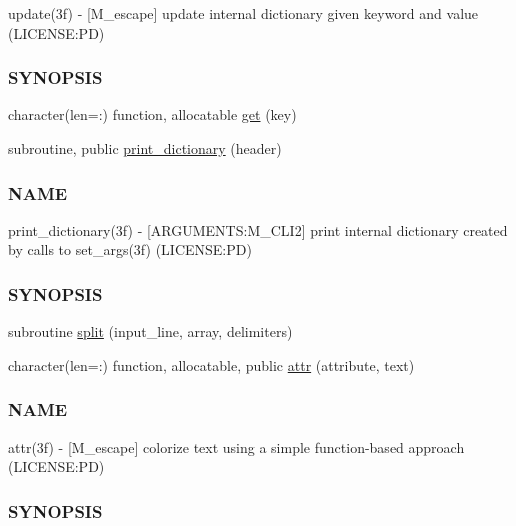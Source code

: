 \begin{DoxyCompactItemize}
\begin{DoxyCompactList}
update(3f) -\/ \mbox{[}M\+\_\+escape\mbox{]} update internal dictionary given keyword and value (L\+I\+C\+E\+N\+SE\+:PD) \subsubsection*{S\+Y\+N\+O\+P\+S\+IS}\end{DoxyCompactList}\item 
character(len=\+:) function, allocatable \mbox{\hyperlink{namespacem__escape_af555c90c278ff964d8bce93ee0368a42}{get}} (key)
\item 
subroutine, public \mbox{\hyperlink{namespacem__escape_a6add907828fd34e94b87f643a5cabc64}{print\+\_\+dictionary}} (header)
\begin{DoxyCompactList}\small\item\em \subsubsection*{N\+A\+ME}

print\+\_\+dictionary(3f) -\/ \mbox{[}A\+R\+G\+U\+M\+E\+N\+TS\+:M\+\_\+\+C\+L\+I2\mbox{]} print internal dictionary created by calls to set\+\_\+args(3f) (L\+I\+C\+E\+N\+SE\+:PD) \subsubsection*{S\+Y\+N\+O\+P\+S\+IS}\end{DoxyCompactList}\item 
subroutine \mbox{\hyperlink{namespacem__escape_af23bd97702864e0f32258e6ec0d51506}{split}} (input\+\_\+line, array, delimiters)
\item 
character(len=\+:) function, allocatable, public \mbox{\hyperlink{namespacem__escape_a916b16ce9be553d669f54cb9575a91be}{attr}} (attribute, text)
\begin{DoxyCompactList}\small\item\em \subsubsection*{N\+A\+ME}

attr(3f) -\/ \mbox{[}M\+\_\+escape\mbox{]} colorize text using a simple function-\/based approach (L\+I\+C\+E\+N\+SE\+:PD) \subsubsection*{S\+Y\+N\+O\+P\+S\+IS}\end{DoxyCompactList}\end{DoxyCompactItemize}
